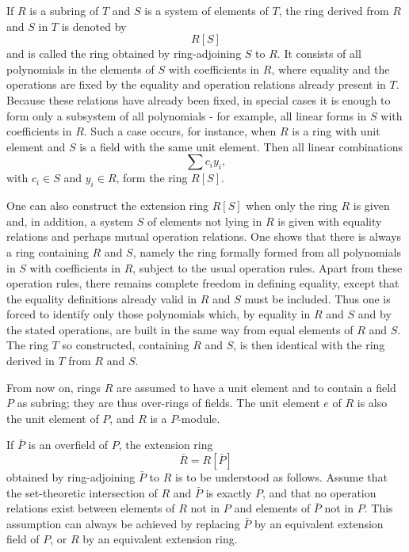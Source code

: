 \documentclass[11pt]{article}
\begin{document}
If \(R\) is a subring of \(T\) and \(S\) is a system of elements of
\(T\), the ring derived from \(R\) and \(S\) in \(T\) is denoted by \[
  R[S]
\] and is called the ring obtained by ring-adjoining \(S\) to \(R\). It
consists of all polynomials in the elements of \(S\) with coefficients
in \(R\), where equality and the operations are fixed by the equality
and operation relations already present in \(T\). Because these
relations have already been fixed, in special cases it is enough to form
only a subsystem of all polynomials - for example, all linear forms in
\(S\) with coefficients in \(R\). Such a case occurs, for instance, when
\(R\) is a ring with unit element and \(S\) is a field with the same
unit element. Then all linear combinations \[
  \sum c_i y_i,
\] with \(c_i\in S\) and \(y_i\in R\), form the ring \(R[S]\).

One can also construct the extension ring \(R[S]\) when only the ring
\(R\) is given and, in addition, a system \(S\) of elements not lying in
\(R\) is given with equality relations and perhaps mutual operation
relations. One shows that there is always a ring containing \(R\) and
\(S\), namely the ring formally formed from all polynomials in \(S\)
with coefficients in \(R\), subject to the usual operation rules. Apart
from these operation rules, there remains complete freedom in defining
equality, except that the equality definitions already valid in \(R\)
and \(S\) must be included. Thus one is forced to identify only those
polynomials which, by equality in \(R\) and \(S\) and by the stated
operations, are built in the same way from equal elements of \(R\) and
\(S\). The ring \(T\) so constructed, containing \(R\) and \(S\), is
then identical with the ring derived in \(T\) from \(R\) and \(S\).

From now on, rings \(R\) are assumed to have a unit element and to
contain a field \(P\) as subring; they are thus over-rings of fields.
The unit element \(e\) of \(R\) is also the unit element of \(P\), and
\(R\) is a \(P\)-module.

If \(\bar P\) is an overfield of \(P\), the extension ring \[
  \bar R=R[\bar P]
\] obtained by ring-adjoining \(\bar P\) to \(R\) is to be understood as
follows. Assume that the set-theoretic intersection of \(R\) and
\(\bar P\) is exactly \(P\), and that no operation relations exist
between elements of \(R\) not in \(P\) and elements of \(\bar P\) not in
\(P\). This assumption can always be achieved by replacing \(\bar P\) by
an equivalent extension field of \(P\), or \(R\) by an equivalent
extension ring.
\end{document}
